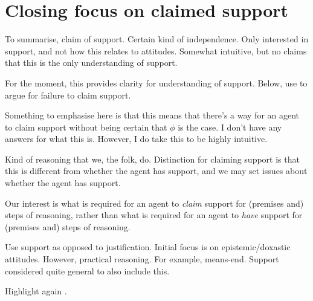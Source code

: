 \section{Closing focus on claimed support}

\begin{note}
  To summarise, claim of support.
  Certain kind of independence.
  Only interested in support, and not how this relates to attitudes.
  Somewhat intuitive, but no claims that this is the only understanding of support.

  For the moment, this provides clarity for understanding of support.
  Below, use to argue for failure to claim support.
\end{note}

\begin{note}
  \color{red}
  Something to emphasise here is that this means that there's a way for an agent to claim support without being certain that \(\phi\) is the case.
  I don't have any answers for what this is.
  However, I do take this to be highly intuitive.
\end{note}


\begin{note}[Adequate]
  Kind of reasoning that we, the folk, do.
  Distinction for claiming support is that this is different from whether the agent has support, and we may set issues about whether the agent has support.

  Our interest is what is required for an agent to \emph{claim} support for (premises and) steps of reasoning, rather than what is required for an agent to \emph{have} support for (premises and) steps of reasoning.

  Use support as opposed to justification.
  Initial focus is on epistemic/doxastic attitudes.
  However, practical reasoning.
  For example, means-end.
  Support considered quite general to also include this.
\end{note}

\begin{note}
  Highlight again .
\end{note}

